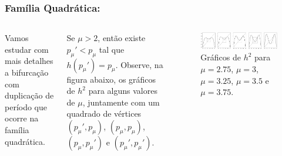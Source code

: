 
\begin{frame}
\vspace{5pt}
\frametitle{Família Quadrática: \subsecname}
\begin{columns}
\column{\dimexpr\paperwidth-15pt}

Vamos estudar com mais detalhes a bifurcação com duplicação de período que ocorre na família quadrática.

Se $\mu > 2$, então existe $p_\mu' < p_\mu$ tal que $h(p_\mu') = p_\mu$.
Observe, na figura abaixo, os gráficos de $h^2$ para alguns valores de $\mu$, juntamente com um quadrado de vértices $(p_\mu', p_\mu)$, $(p_\mu, p_\mu)$, $(p_\mu, p_\mu')$ e $(p_\mu', p_\mu')$.

\begin{figure}[!htb]
\centering
\includegraphics[scale=0.375]{images/h^2withboxes.png}
\caption{Gráficos de $h^2$ para $\mu = 2.75$, $\mu = 3$, $\mu = 3.25$, $\mu = 3.5$ e $\mu = 3.75$.}
\label{h^2-and-boxes}
\end{figure}

\end{columns}
\end{frame}


